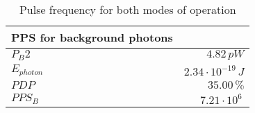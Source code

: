 \begin{table}[H]
\centering
\caption{Pulse frequency for both modes of operation}
\label{tab:PPS}
\begin{tabular}{|l|r|}\hline
    \textbf{PPS for background photons} & \\
    \hline 
    $P_B2$ & $4.82\,p W$ \\
    $E_{photon}$ & $2.34\cdot10^{-19}\,J$ \\
    $PDP$ & $35.00\, \%$ \\
    $PPS_B$ & $7.21\cdot10^{6}\,$ \\
    \hline 
\end{tabular}
\end{table}
